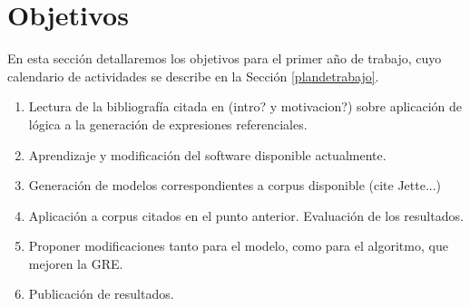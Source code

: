 \section{Objetivos}
\label{objetivos}

En esta secci\'on detallaremos los objetivos para el primer a\~no de trabajo, cuyo calendario de actividades se describe en la Secci\'on \ref{plandetrabajo}. 



\begin{enumerate}
\item Lectura de la bibliograf\'ia citada en (intro? y motivacion?) sobre aplicaci\'on de l\'ogica a la generaci\'on de expresiones referenciales.
\item Aprendizaje y modificaci\'on del software disponible actualmente.
\item Generaci\'on de modelos correspondientes a corpus disponible (cite Jette...)
\item Aplicaci\'on a corpus citados en el punto anterior. Evaluaci\'on de los resultados.
\item Proponer modificaciones tanto para el modelo, como para el algoritmo, que mejoren la GRE.
\item Publicaci\'on de resultados.
\end{enumerate}

